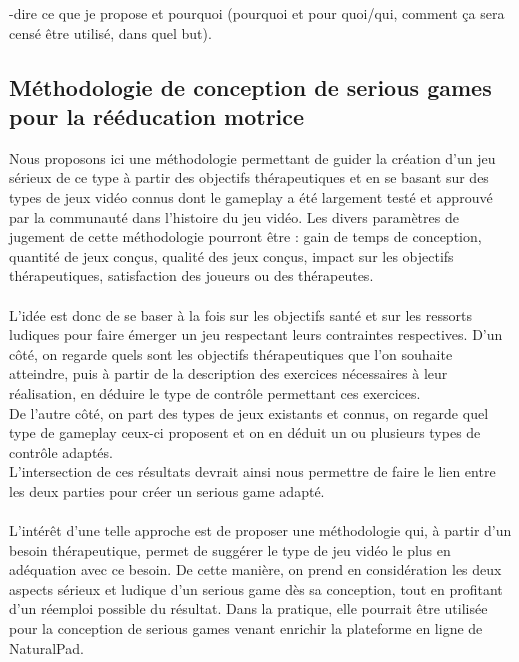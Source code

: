 	-dire ce que je propose et pourquoi (pourquoi et pour quoi/qui, comment ça sera censé être utilisé, dans quel but).
	
\subsection{Méthodologie de conception de serious games pour la rééducation motrice}
Nous proposons ici une méthodologie permettant de guider la création d’un jeu sérieux de ce type à partir des objectifs thérapeutiques et en se basant sur des types de jeux vidéo connus dont le gameplay a été largement testé et approuvé par la communauté dans l’histoire du jeu vidéo. Les divers paramètres de jugement de cette méthodologie pourront être : gain de temps de conception, quantité de jeux conçus, qualité des jeux conçus, impact sur les objectifs thérapeutiques, satisfaction des joueurs ou des thérapeutes.

\paragraph{}L’idée est donc de se baser à la fois sur les objectifs santé et sur les ressorts ludiques pour faire émerger un jeu respectant leurs contraintes respectives.
D’un côté, on regarde quels sont les objectifs thérapeutiques que l’on souhaite atteindre, puis à partir de la description des exercices nécessaires à leur réalisation, en déduire le type de contrôle permettant ces exercices.\\
De l’autre côté, on part des types de jeux existants et connus, on regarde quel type de gameplay ceux-ci proposent et on en déduit un ou plusieurs types de contrôle adaptés.\\
L’intersection de ces résultats devrait ainsi nous permettre de faire le lien entre les deux parties pour créer un serious game adapté. 

\paragraph{}L’intérêt d’une telle approche est de proposer une méthodologie qui, à partir d’un besoin thérapeutique, permet de suggérer le type de jeu vidéo le plus en adéquation avec ce besoin. De cette manière, on prend en considération les deux aspects sérieux et ludique d’un serious game dès sa conception, tout en profitant d’un réemploi possible du résultat. Dans la pratique, elle pourrait être utilisée pour la conception de serious games venant enrichir la plateforme en ligne de NaturalPad. 

